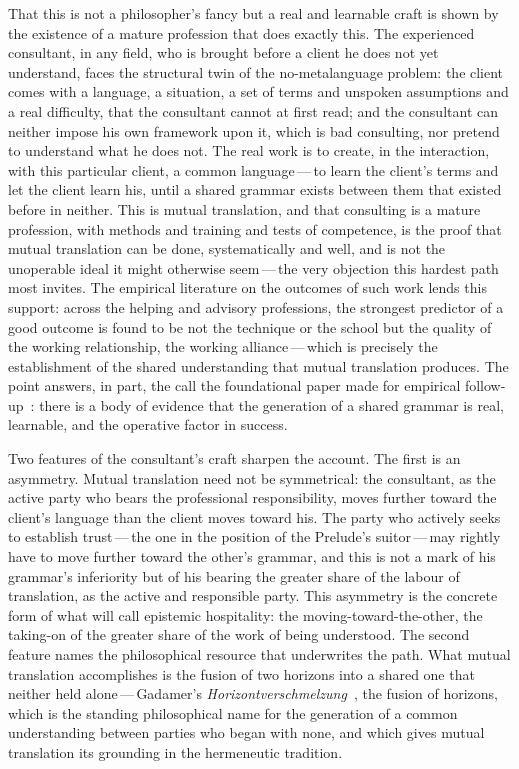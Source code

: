 That this is not a philosopher's fancy but a real and learnable craft is shown by the existence of a mature profession that does exactly this. The experienced consultant, in any field, who is brought before a client he does not yet understand, faces the structural twin of the no-metalanguage problem: the client comes with a language, a situation, a set of terms and unspoken assumptions and a real difficulty, that the consultant cannot at first read; and the consultant can neither impose his own framework upon it, which is bad consulting, nor pretend to understand what he does not. The real work is to create, in the interaction, with this particular client, a common language\,---\,to learn the client's terms and let the client learn his, until a shared grammar exists between them that existed before in neither. This is mutual translation, and that consulting is a mature profession, with methods and training and tests of competence, is the proof that mutual translation can be done, systematically and well, and is not the unoperable ideal it might otherwise seem\,---\,the very objection this hardest path most invites. The empirical literature on the outcomes of such work lends this support: across the helping and advisory professions, the strongest predictor of a good outcome is found to be not the technique or the school but the quality of the working relationship, the working alliance\,---\,which is precisely the establishment of the shared understanding that mutual translation produces. The point answers, in part, the call the foundational paper made for empirical follow-up~\parencite{wanhong_grb}: there is a body of evidence that the generation of a shared grammar is real, learnable, and the operative factor in success.

Two features of the consultant's craft sharpen the account. The first is an asymmetry. Mutual translation need not be symmetrical: the consultant, as the active party who bears the professional responsibility, moves further toward the client's language than the client moves toward his. The party who actively seeks to establish trust\,---\,the one in the position of the Prelude's suitor\,---\,may rightly have to move further toward the other's grammar, and this is not a mark of his grammar's inferiority but of his bearing the greater share of the labour of translation, as the active and responsible party. This asymmetry is the concrete form of what  will call epistemic hospitality: the moving-toward-the-other, the taking-on of the greater share of the work of being understood. The second feature names the philosophical resource that underwrites the path. What mutual translation accomplishes is the fusion of two horizons into a shared one that neither held alone\,---\,Gadamer's \emph{Horizontverschmelzung}~\parencite{gadamer2004}, the fusion of horizons, which is the standing philosophical name for the generation of a common understanding between parties who began with none, and which gives mutual translation its grounding in the hermeneutic tradition.

